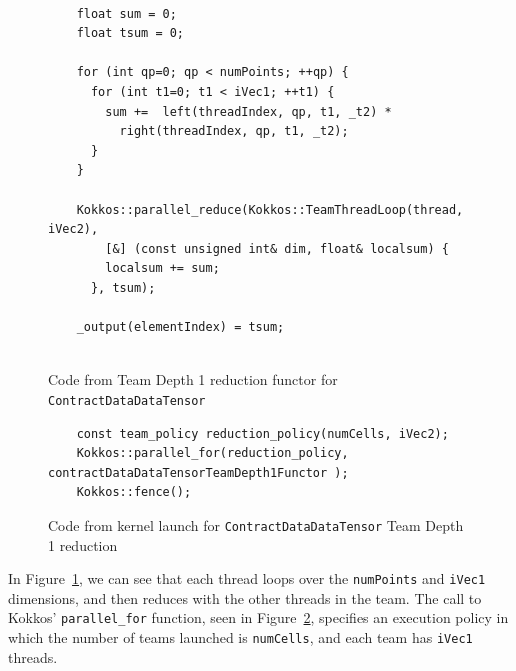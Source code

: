 \begin{figure}[ht]
    \begin{lstlisting}

    float sum = 0;
    float tsum = 0;

    for (int qp=0; qp < numPoints; ++qp) {
      for (int t1=0; t1 < iVec1; ++t1) {
        sum +=  left(threadIndex, qp, t1, _t2) *
          right(threadIndex, qp, t1, _t2);
      }
    }

    Kokkos::parallel_reduce(Kokkos::TeamThreadLoop(thread, iVec2),
        [&] (const unsigned int& dim, float& localsum) {
        localsum += sum;
      }, tsum);

    _output(elementIndex) = tsum;
    
 \end{lstlisting}
\caption{Code from Team Depth 1 reduction functor for \texttt{ContractDataDataTensor}
\label{lst:ContractDataDataTensorDepth1Functor}} 
\end{figure}

\begin{figure}[ht]
    \begin{lstlisting}
    const team_policy reduction_policy(numCells, iVec2);
    Kokkos::parallel_for(reduction_policy, contractDataDataTensorTeamDepth1Functor );
    Kokkos::fence();
 \end{lstlisting}
\caption{Code from kernel launch for \texttt{ContractDataDataTensor} Team Depth
1 reduction
\label{lst:ContractDataDataTensorDepth1Call}} 
\end{figure}

In Figure~\ref{lst:ContractDataDataTensorDepth1Functor}, we can see that each
thread loops over the \texttt{numPoints} and \texttt{iVec1} dimensions, and then
reduces with the other threads in the team.  The call to Kokkos'
\texttt{parallel\_for} function, seen in
Figure~\ref{lst:ContractDataDataTensorDepth1Call}, specifies an execution policy
in which the number of teams launched is \texttt{numCells}, and each team has
\texttt{iVec1} threads.

